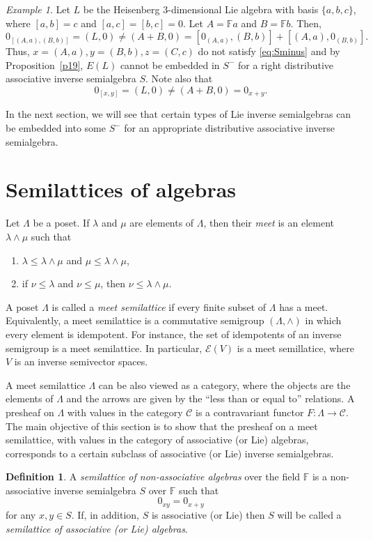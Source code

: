 \documentclass{amsart}
\newcommand{\E}{\mathcal{E}}
\newcommand{\F}{\mathbb{F}}
\newcommand{\0}{{\vartheta}}
\theoremstyle{definition}
\newtheorem{defn}[thm]{Definition}
\theoremstyle{remark}
\newtheorem{ex}[thm]{Example}
\numberwithin{equation}{section}
\newtheorem*{Theorem A}{\textbf{Theorem A}}
\newtheorem*{Corollary E}{\textbf{Corollary E}}
\newtheorem*{Corollary F}{\textbf{Corollary F}}
\newtheorem*{Theorem B}{\textbf{Theorem B}}
\newtheorem*{Theorem C}{\textbf{Theorem C}}
\newtheorem*{Theorem D}{\textbf{Theorem B}}
\newtheorem*{p a}{\textbf{Proof of  Theorem A}}
\newtheorem*{p b}{\textbf{Proof of Theorem B}}
\newtheorem*{p c}{\textbf{Proof of  Theorem C}}
\newtheorem*{p d}{\textbf{Proof of  Theorem D}}
\begin{document}
\begin{ex}\label{exHeisenberg}
Let $L$ be the Heisenberg 3-dimensional Lie algebra with basis  $\{a,b,c\}$,  where $[a,b]=c$ and $[a,c]=[b,c]=0$. Let $A= \F a$ and $B= \F b$. Then, 
$$0_{[(A,a),(B,b)]}=(L,0)\neq (A+B,0) =  [0_{(A,a)},(B,b)]+[(A,a),0_{(B,b)}].$$ 
Thus, $x=(A,a), y= (B,b), z= (C,c)$  do not satisfy \eqref{eq:Sminus} and by Proposition~\ref{p19}, $E(L)$ cannot be embedded in $S^-$ for a right distributive associative inverse semialgebra $S$.  Note also that 
$$0_{[x,y]} = (L,0)\neq (A+B,0) =  0_{x+y}. $$ 
\end{ex}

In the next section, we will see that certain types of Lie inverse semialgebras can be embedded into some $S^-$
for an appropriate distributive associative inverse semialgebra.


\section{Semilattices of algebras}\label{s: semillatices}
Let $\Lambda$  be a poset. If $\lambda$ and $\mu$ are elements of $\Lambda$, then their  {\em meet} is an element $\lambda\wedge \mu$ such that
\begin{enumerate}
    \item $\lambda\leq \lambda\wedge\mu$ and $\mu\leq \lambda\wedge\mu$, 
    \item if $\nu\leq \lambda$ and $\nu\leq \mu$, then $\nu\leq \lambda\wedge\mu.$
\end{enumerate}
A poset $\Lambda$ is called a {\em meet semilattice} if every finite subset of $\Lambda$ has a meet. Equivalently, a meet semilattice is a commutative semigroup $(\Lambda,\wedge)$ in which every element is idempotent.  For instance, the set of idempotents of an inverse semigroup  is a meet semilattice.  In particular, $\E (V)$ is a meet semillatice, where $V$ is an inverse semivector spaces.

A meet semilattice $\Lambda$ can be also viewed as a category, where the objects are the elements of $\Lambda$ and the arrows are given by the ``less than or equal to'' relations.  A presheaf on $\Lambda$ with values in the category $\mathcal{C}$ is a contravariant functor $F: \Lambda\to \mathcal{C}$.
The main objective of this section is to show that the presheaf on a meet semilattice, with values in the category of associative (or Lie) algebras, corresponds to a certain subclass of associative (or Lie) inverse semialgebras.


\begin{defn}\label{def:SemilatNonAssocAlg} A {\em semilattice of non-associative algebras} over  the field $\F$ is a  non-associative inverse semialgebra $S$ over $\F$ such that 
\begin{equation}\label{eq:semilatticeAlg}
    0_{xy}=0_{x+y}
\end{equation} for any  $x,y \in S.$ If, in addition, $S$ is  associative (or Lie) then  $S$ will be called a {\em semilattice of associative (or Lie) algebras}.
\end{defn}
\end{document}
